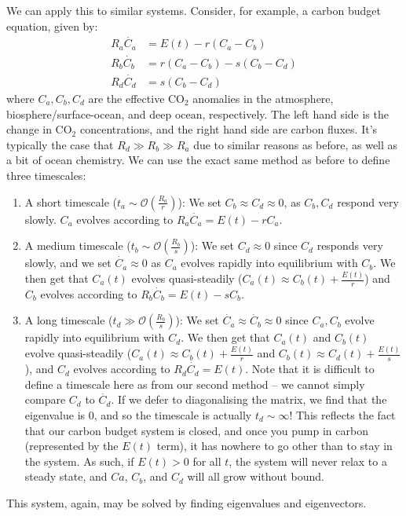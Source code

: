 We can apply this to similar systems. Consider, for example, a carbon budget equation, given by:
\begin{align}
    R_a \dot{C_a} &= E(t)-r (C_a-C_b) \\ 
    R_b \dot{C_b} &= r (C_a-C_b) - s (C_b-C_d)\\
    R_d \dot{C_d} &=  s (C_b-C_d)
\end{align}
where $C_a,C_b,C_d$ are the effective CO$_2$ anomalies in the atmosphere, biosphere/surface-ocean, and deep ocean, respectively. The left hand side is the change in CO$_2$ concentrations, and the right hand side are carbon fluxes. It's typically the case that $R_d\gg R_b\gg R_a$ due to similar reasons as before, as well as a bit of ocean chemistry. We can use the exact same method as before to define three timescales:
\begin{enumerate}
    \item A short timescale ($t_a\sim\mathcal{O}\left(\frac{R_a}{r}\right)$):  We set $C_b\approx C_d\approx 0$, as $C_b,C_d$ respond very slowly. $C_a$ evolves according to $R_a \dot{C_a} = E(t)-r C_a$.
    \item A medium timescale ($t_b\sim\mathcal{O}\left(\frac{R_b}{s}\right)$): We set $C_d \approx 0$ since $C_d$ responds very slowly, and we set $\dot{C_a} \approx 0$ as $C_a$ evolves rapidly into equilibrium with $C_b$. We then get that $C_a(t)$ evolves quasi-steadily ($C_a(t)\approx C_b(t)+\frac{E(t)}{r}$) and $C_b$ evolves according to $R_b \dot{C_b}=E(t)-sC_b$.
    \item A long timescale ($t_d\gg\mathcal{O}\left(\frac{R_b}{s}\right)$): We set $\dot{C_a}\approx \dot{C_b} \approx 0$ since $C_a,C_b$ evolve rapidly into equilibrium with $C_d$. We then get that $C_a(t)$ and $C_b(t)$ evolve quasi-steadily ($C_a(t)\approx C_b(t)+\frac{E(t)}{r}$ and $C_b(t)\approx C_d(t) +\frac{E(t)}{s}$), and $C_d$ evolves according to $R_d \dot{C_d}=E(t)$. Note that it is difficult to define a timescale here as from our second method – we cannot simply compare $C_d$ to $\dot{C_d}$. If we defer to diagonalising the matrix, we find that the eigenvalue is $0$, and so the timescale is actually $t_d\sim\infty$! This reflects the fact that our carbon budget system is closed, and once you pump in carbon (represented by the $E(t)$ term), it has nowhere to go other than to stay in the system. As such, if $E(t)>0$ for all $t$, the system will never relax to a steady state, and $Ca$, $C_b$, and $C_d$ will all grow without bound. 
\end{enumerate}
This system, again, may be solved by finding eigenvalues and eigenvectors. 


